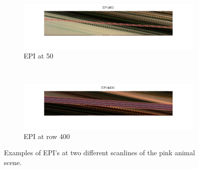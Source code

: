 \documentclass[a4paper]{article}
\begin{document}
\begin{figure}[ht]
	\vspace{3mm}
	\begin{subfigure}[h]{0.48\textwidth}
	  \includegraphics[width=\textwidth]{EPI50}
	  \caption*{EPI at 50}
	\end{subfigure}
    	~
	\begin{subfigure}[h]{0.48\textwidth}
	  \centering
	  \includegraphics[width=\textwidth]{EPI400}
	  \caption*{EPI at row 400}
	\end{subfigure}
\caption{Examples of EPI's at two different scanlines of the pink animal scene.}
\label{fig:EPIs}
\end{figure}
\end{document}

